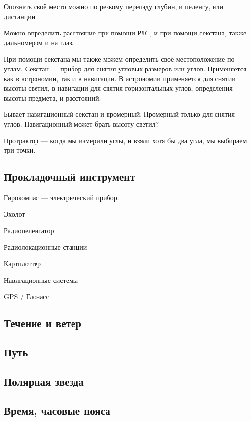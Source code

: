 \documentclass{article}        %
\begin{document}
Опознать своё место можно по резкому перепаду глубин, и пеленгу, или дистанции.

Можно определить расстояние при помощи РЛС, и при помощи секстана, 
также дальномером и на глаз. 

При помощи секстана мы также можем определить своё местоположение по углам. 
Секстан --- прибор для снятия угловых размеров или углов. Применяется как в астрономии, так и в навигации. В астрономии применяется для снятии высоты светил, в навигации для снятия горизонтальных углов, определения высоты предмета, и расстояний.

Бывает навигационный секстан и промерный. Промерный только для снятия углов. Навигационный может брать высоту светил?

Протрактор --- когда мы измерили углы, и взяли хотя бы два угла, мы выбираем три точки. 
\subsection{Прокладочный инструмент}
Гирокомпас --- электрический прибор.

Эхолот

Радиопеленгатор

Радиолокационные станции

Картплоттер

Навигационные системы

GPS / Глонасс

\subsection{Течение и ветер}

\subsection{Путь}

\subsection{Полярная звезда}

\subsection{Время, часовые пояса}
\end{document}
